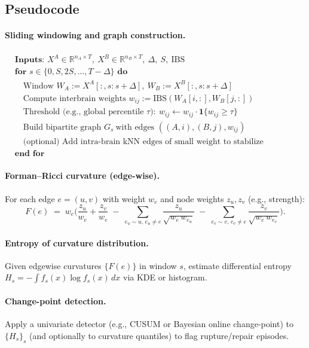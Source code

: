 \documentclass{article}
\theoremstyle{definition}
\begin{document}
\subsection{Pseudocode}

\paragraph{Sliding windowing and graph construction.}
\begin{align*}
&\textbf{Inputs: } X^A \in \mathbb{R}^{n_A \times T},\ X^B \in \mathbb{R}^{n_B \times T},\ \Delta,\ S,\ \mathrm{IBS} \\
&\textbf{for } s \in \{0, S, 2S, \dots, T-\Delta\} \textbf{ do}\\
&\quad \text{Window } W_A := X^A[:, s{:}s{+}\Delta],\ W_B := X^B[:, s{:}s{+}\Delta]\\
&\quad \text{Compute interbrain weights } w_{ij} := \mathrm{IBS}(W_A[i,:], W_B[j,:])\\
&\quad \text{Threshold (e.g., global percentile } \tau):\ w_{ij} \leftarrow w_{ij}\cdot\mathbf{1}\{w_{ij}\ge \tau\}\\
&\quad \text{Build bipartite graph } G_s\ \text{with edges } ((A,i),(B,j), w_{ij})\\
&\quad \text{(optional) Add intra-brain kNN edges of small weight to stabilize neighborhoods}\\
&\textbf{end for}
\end{align*}

\paragraph{Forman--Ricci curvature (edge-wise).}
For each edge $e=(u,v)$ with weight $w_e$ and node weights $z_u,z_v$ (e.g., strength):
\[
F(e) \;=\; w_e \Bigg(
\frac{z_u}{w_e} + \frac{z_v}{w_e}
\;-\; \sum_{e_u\sim u,\,e_u\neq e}\frac{z_u}{\sqrt{w_e\,w_{e_u}}}
\;-\; \sum_{e_v\sim v,\,e_v\neq e}\frac{z_v}{\sqrt{w_e\,w_{e_v}}}
\Bigg).
\]

\paragraph{Entropy of curvature distribution.}
Given edgewise curvatures $\{F(e)\}$ in window $s$, estimate differential entropy
$H_s = -\!\int f_s(x)\log f_s(x)\,dx$ via KDE or histogram.

\paragraph{Change-point detection.}
Apply a univariate detector (e.g., CUSUM or Bayesian online change-point) to
$\{H_s\}_s$ (and optionally to curvature quantiles) to flag rupture/repair episodes.
\end{document}
